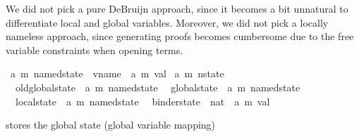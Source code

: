 \begin{isabellebody}
\begin{isamarkuptext}
We did not pick a pure DeBruijn approach, since it becomes a bit unnatural to differentiate local
and global variables. Moreover, we did not pick a locally nameless approach, since generating proofs
becomes cumbersome due to the free variable constraints when opening terms.%
\end{isamarkuptext}\isamarkuptrue%
\isamarkupfalse%
\ {\isacharparenleft}{\kern0pt}{\isacharprime}{\kern0pt}a{\isacharcomma}{\kern0pt}\ {\isacharprime}{\kern0pt}m{\isacharparenright}{\kern0pt}\ named{\isacharunderscore}{\kern0pt}state\ {\isacharequal}{\kern0pt}\ {\isachardoublequoteopen}vname\ {\isasymrightharpoonup}\ {\isacharparenleft}{\kern0pt}{\isacharprime}{\kern0pt}a{\isacharcomma}{\kern0pt}\ {\isacharprime}{\kern0pt}m{\isacharparenright}{\kern0pt}\ val{\isachardoublequoteclose}\isanewline
\isanewline
{}\isamarkupfalse%
\ {\isacharparenleft}{\kern0pt}{\isacharprime}{\kern0pt}a{\isacharcomma}{\kern0pt}\ {\isacharprime}{\kern0pt}m{\isacharparenright}{\kern0pt}\ nstate\ {\isacharequal}{\kern0pt}\isanewline
\ \ old{\isacharunderscore}{\kern0pt}global{\isacharunderscore}{\kern0pt}state\ {\isacharcolon}{\kern0pt}{\isacharcolon}{\kern0pt}\ {\isachardoublequoteopen}{\isacharparenleft}{\kern0pt}{\isacharprime}{\kern0pt}a{\isacharcomma}{\kern0pt}\ {\isacharprime}{\kern0pt}m{\isacharparenright}{\kern0pt}\ named{\isacharunderscore}{\kern0pt}state{\isachardoublequoteclose}\isanewline
\ \ global{\isacharunderscore}{\kern0pt}state\ {\isacharcolon}{\kern0pt}{\isacharcolon}{\kern0pt}\ {\isachardoublequoteopen}{\isacharparenleft}{\kern0pt}{\isacharprime}{\kern0pt}a{\isacharcomma}{\kern0pt}\ {\isacharprime}{\kern0pt}m{\isacharparenright}{\kern0pt}\ named{\isacharunderscore}{\kern0pt}state{\isachardoublequoteclose}\isanewline
\ \ local{\isacharunderscore}{\kern0pt}state\ {\isacharcolon}{\kern0pt}{\isacharcolon}{\kern0pt}\ {\isachardoublequoteopen}{\isacharparenleft}{\kern0pt}{\isacharprime}{\kern0pt}a{\isacharcomma}{\kern0pt}\ {\isacharprime}{\kern0pt}m{\isacharparenright}{\kern0pt}\ named{\isacharunderscore}{\kern0pt}state{\isachardoublequoteclose}\isanewline
\ \ binder{\isacharunderscore}{\kern0pt}state\ {\isacharcolon}{\kern0pt}{\isacharcolon}{\kern0pt}\ {\isachardoublequoteopen}nat\ {\isasymrightharpoonup}\ {\isacharparenleft}{\kern0pt}{\isacharprime}{\kern0pt}a{\isacharcomma}{\kern0pt}\ {\isacharprime}{\kern0pt}m{\isacharparenright}{\kern0pt}\ val{\isachardoublequoteclose}%
\begin{isamarkuptext}%
 stores the global state (global variable mapping) 

\end{isamarkuptext}
\end{isabellebody}
